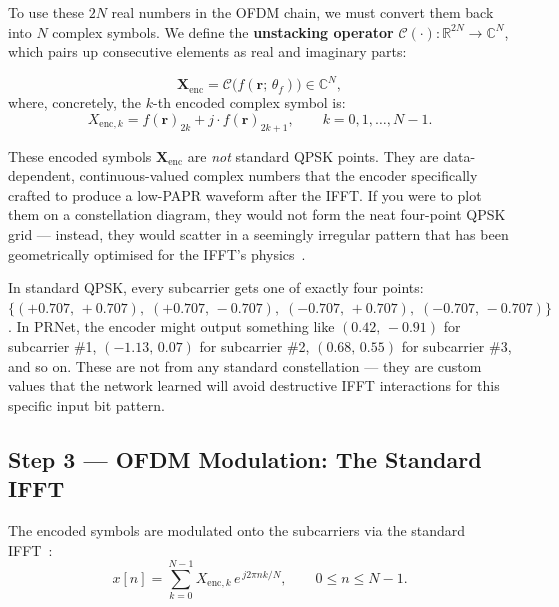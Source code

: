 To use these $2N$ real numbers in the OFDM chain, we must convert them
back into $N$ complex symbols.  We define the \textbf{unstacking operator}
$\mathcal{C}(\cdot) : \mathbb{R}^{2N} \to \mathbb{C}^{N}$, which pairs
up consecutive elements as real and imaginary parts:

\begin{equation}
    \bm{X}_{\mathrm{enc}} = \mathcal{C}\bigl(f(\bm{r};\,\theta_f)\bigr)
    \in \mathbb{C}^{N},
    \label{eq:prnet_xenc_def}
\end{equation}
where, concretely, the $k$-th encoded complex symbol is:
\begin{equation}
    X_{\mathrm{enc},k}
    = f(\bm{r})_{2k} + j \cdot f(\bm{r})_{2k+1},
    \qquad k = 0, 1, \dots, N-1.
    \label{eq:prnet_complex_rebuild}
\end{equation}

These encoded symbols $\bm{X}_{\mathrm{enc}}$ are \emph{not} standard QPSK
points.  They are data-dependent, continuous-valued complex numbers that the
encoder specifically crafted to produce a low-PAPR waveform after the IFFT.
If you were to plot them on a constellation diagram, they would not form the
neat four-point QPSK grid --- instead, they would scatter in a seemingly
irregular pattern that has been geometrically optimised for the IFFT's
physics~\cite{kim2017novel}.

\begin{workingexample}
    In standard QPSK, every subcarrier gets one of exactly four points:
    $\{(+0.707,\,+0.707),\; (+0.707,\,-0.707),\;
      (-0.707,\,+0.707),\; (-0.707,\,-0.707)\}$.
    In PRNet, the encoder might output something like
    $(0.42,\, -0.91)$ for subcarrier \#1,
    $(-1.13,\, 0.07)$ for subcarrier \#2,
    $(0.68,\, 0.55)$ for subcarrier \#3, and so on.
    These are not from any standard constellation --- they are custom values
    that the network learned will avoid destructive IFFT interactions for
    this specific input bit pattern.
\end{workingexample}


\subsection{Step 3 --- OFDM Modulation: The Standard IFFT}

The encoded symbols are modulated onto the subcarriers via the standard
IFFT~\cite{kim2017novel}:
\begin{equation}
    \boxed{x[n] = \sum_{k=0}^{N-1} X_{\mathrm{enc},k}\, e^{\,j2\pi nk/N},
    \qquad 0 \le n \le N-1.}
    \label{eq:prnet_ifft}
\end{equation}

